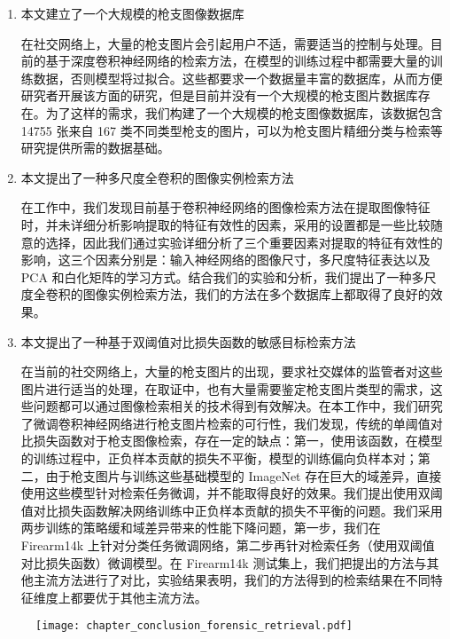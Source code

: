 \begin{enumerate}
\item 本文建立了一个大规模的枪支图像数据库

在社交网络上，大量的枪支图片会引起用户不适，需要适当的控制与处理。目前的基于深度卷积神经网络的检索方法，在模型的训练过程中都需要大量的训练数据，否则模型将过拟合。这些都要求一个数据量丰富的数据库，从而方便研究者开展该方面的研究，但是目前并没有一个大规模的枪支图片数据库存在。为了这样的需求，我们构建了一个大规模的枪支图像数据库，该数据包含 14755 张来自 167 类不同类型枪支的图片，可以为枪支图片精细分类与检索等研究提供所需的数据基础。

\item  本文提出了一种多尺度全卷积的图像实例检索方法

在工作中，我们发现目前基于卷积神经网络的图像检索方法在提取图像特征时，并未详细分析影响提取的特征有效性的因素，采用的设置都是一些比较随意的选择，因此我们通过实验详细分析了三个重要因素对提取的特征有效性的影响，这三个因素分别是：输入神经网络的图像尺寸，多尺度特征表达以及 PCA 和白化矩阵的学习方式。结合我们的实验和分析，我们提出了一种多尺度全卷积的图像实例检索方法，我们的方法在多个数据库上都取得了良好的效果。

\item 本文提出了一种基于双阈值对比损失函数的敏感目标检索方法

在当前的社交网络上，大量的枪支图片的出现，要求社交媒体的监管者对这些图片进行适当的处理，在取证中，也有大量需要鉴定枪支图片类型的需求，这些问题都可以通过图像检索相关的技术得到有效解决。在本工作中，我们研究了微调卷积神经网络进行枪支图片检索的可行性，我们发现，传统的单阈值对比损失函数对于枪支图像检索，存在一定的缺点：第一，使用该函数，在模型的训练过程中，正负样本贡献的损失不平衡，模型的训练偏向负样本对；第二，由于枪支图片与训练这些基础模型的 ImageNet 存在巨大的域差异，直接使用这些模型针对检索任务微调，并不能取得良好的效果。我们提出使用双阈值对比损失函数解决网络训练中正负样本贡献的损失不平衡的问题。我们采用两步训练的策略缓和域差异带来的性能下降问题，第一步，我们在 Firearm14k 上针对分类任务微调网络，第二步再针对检索任务（使用双阈值对比损失函数）微调模型。在 Firearm14k 测试集上，我们把提出的方法与其他主流方法进行了对比，实验结果表明，我们的方法得到的检索结果在不同特征维度上都要优于其他主流方法。
\end{enumerate}

\begin{figure}
\centering
\texttt{[image: chapter\_conclusion\_forensic\_retrieval.pdf]}
\label{fig:forensic_image_retrieval}
\end{figure}

